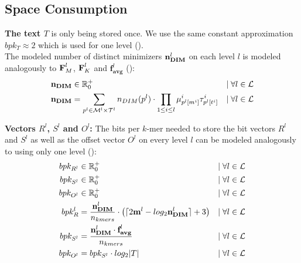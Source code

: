 \documentclass[a4paper,titlepage,onecolumn,oneside,12pt,nenglish,titlepage=firstiscover]{scrbook}
\theoremstyle{plain} %
\theoremstyle{definition} %
\theoremstyle{remark} %
\theoremstyle{plain}
\newcommand{\RR}{\mathbb{R}} %
\newcommand{\minimizerLength}{m}
\newcommand{\threshold}{t}
\newcommand{\level}{l}
\newcommand{\varAverageFrequency}{\textbf{f}_{\textbf{avg}}}
\newcommand{\possibleMinimizerLengths}{\mathcal{M}}
\newcommand{\possibleThresholds}{\mathcal{T}}
\newcommand{\indicatorm}{\mu}
\newcommand{\indicatort}{\tau}
\newcommand{\varMinimizerLength}{\textbf{\minimizerLength}}
\begin{document}
\subsection{Space Consumption}
\textbf{The text $T$} is only being stored once. We use the same constant approximation $bpk_T \approx 2$ which is used for one level ().\\

The modeled number of distinct \infrequent minimizers $\varNumberOfDistinctMinimizers^\level$ on each level $\level$ is modeled analogously to $\varCDF{M}^\level$, $\varCDF{K}^\level$ and $\varAverageFrequency^\level$ ():
\begin{align}
	\varNumberOfDistinctMinimizers &\in \RR^+_0 &\mid \forall l \in \setOfLevels
	\\
	\varNumberOfDistinctMinimizers &= \sum\limits_{\levelParameters{\level} \in \possibleMinimizerLengths^\level \times \possibleThresholds^\level}
	\numberOfDistinctMinimizers{\levelParameters{\level}} 
	\cdot
	\prod_{1\leq i \leq \level} \indicatorm^i_{\parameterAccess{\level}{\minimizerLength}{i}} \indicatort^i_{\parameterAccess{\level}{\threshold}{i}}
	& \mid \forall l \in \setOfLevels
\end{align}

\textbf{Vectors $R^\level$, $S^\level$ and $O^\level$:} The bits per $k$-mer needed to store the bit vectors $R^\level$ and $S^\level$ as well as the offset vector $O^\level$ on every level $\level$ can be modeled analogously to using only one level ():
\begin{align}
	bpk_{R^\level} & \in \RR^+_0 &\mid \forall l \in \setOfLevels
	\\
	bpk_{S^\level} & \in \RR^+_0 &\mid \forall l \in \setOfLevels
	\\
	bpk_{O^\level} & \in \RR^+_0 &\mid \forall l \in \setOfLevels
	\\
	bpk_{R}^\level &= \frac{\varNumberOfDistinctMinimizers^\level}{\nkmers} \cdot \left(\lceil 2\varMinimizerLength^\level - log_2\varNumberOfDistinctMinimizers^\level \rceil + 3 \right) &\mid \forall l \in \setOfLevels
	\\
	bpk_{S^\level} &= \frac{\varNumberOfDistinctMinimizers^\level \cdot \varAverageFrequency^\level}{\nkmers} &\mid \forall l \in \setOfLevels
	\\
	bpk_{O^\level} &= bpk_{S^\level} \cdot log_2 |T| &\mid \forall l \in \setOfLevels
\end{align}
\end{document}
